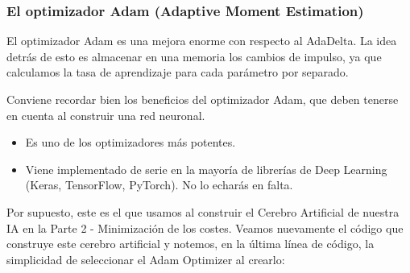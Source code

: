 \documentclass[]{book}
\providecommand{\tightlist}{%
  \setlength{\itemsep}{0pt}\setlength{\parskip}{0pt}}
\begin{document}
\hypertarget{el-optimizador-adam-adaptive-moment-estimation}{%
\subsubsection{El optimizador Adam (Adaptive Moment Estimation)}\label{el-optimizador-adam-adaptive-moment-estimation}}

El optimizador Adam es una mejora enorme con respecto al AdaDelta. La idea detrás de esto es almacenar en una memoria los cambios de impulso, ya que calculamos la tasa de aprendizaje para cada parámetro por separado.

Conviene recordar bien los beneficios del optimizador Adam, que deben tenerse en cuenta al construir una red neuronal.

\begin{itemize}
\tightlist
\item
  Es uno de los optimizadores más potentes.
\item
  Viene implementado de serie en la mayoría de librerías de Deep Learning (Keras, TensorFlow, PyTorch). No lo echarás en falta.
\end{itemize}

Por supuesto, este es el que usamos al construir el Cerebro Artificial de nuestra IA en la Parte 2 - Minimización de los costes. Veamos nuevamente el código que construye este cerebro artificial y notemos, en la última línea de código, la simplicidad de seleccionar el Adam Optimizer al crearlo:
\end{document}
